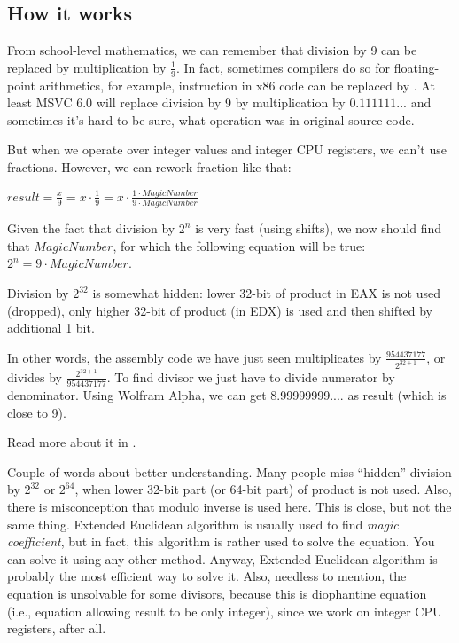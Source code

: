 ﻿\subsection{How it works}

From school-level mathematics, we can remember that division by 9 can be replaced by multiplication by $\frac{1}{9}$.
In fact, sometimes compilers do so for floating-point arithmetics, for example,  instruction in x86 code
can be replaced by .
At least MSVC 6.0 will replace division by 9 by multiplication by $0.111111...$ and sometimes it's hard to be sure,
what operation was in original source code.

But when we operate over integer values and integer CPU registers, we can't use fractions.
However, we can rework fraction like that:

\begin{center}
$result = \frac{x}{9} = x \cdot \frac{1}{9} = x \cdot \frac{1 \cdot MagicNumber}{9 \cdot MagicNumber}$
\end{center}

Given the fact that division by $2^n$ is very fast (using shifts), we now should find that $MagicNumber$,
for which the following
equation will be true: $2^n = 9 \cdot MagicNumber$.

Division by $2^{32}$ is somewhat hidden: lower 32-bit of product in EAX is not used (dropped), only higher 32-bit of
product (in EDX) is used and then shifted by additional 1 bit.

In other words, the assembly code we have just seen multiplicates by {\Large $\frac{954437177}{2^{32+1}}$},
or divides by {\Large $\frac{2^{32+1}}{954437177}$}.
To find divisor we just have to divide numerator by denominator.
Using Wolfram Alpha, we can get 8.99999999.... as result (which is close to 9).


Read more about it in .

Couple of words about better understanding.
Many people miss ``hidden'' division by $2^{32}$ or $2^{64}$,
when lower 32-bit part (or 64-bit part) of product is not used.
Also, there is misconception that modulo inverse is used here. This is close, but not the same thing.
Extended Euclidean algorithm is usually used to find \textit{magic coefficient}, but in fact,
this algorithm is rather used to solve the equation. You can solve it using any other method.
Anyway, Extended Euclidean algorithm is probably the most efficient way to solve it.
Also, needless to mention, the equation is unsolvable for some divisors, because this is diophantine equation
(i.e., equation allowing result to be only integer), since we work on integer CPU registers, after all.

